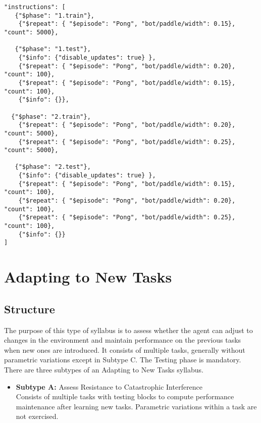 \begin{small}
\begin{verbatim}
"instructions": [    
   {"$phase": "1.train"}, 
    {"$repeat": { "$episode": "Pong", "bot/paddle/width": 0.15}, "count": 5000}, 

   {"$phase": "1.test"},   
    {"$info": {"disable_updates": true} },
    {"$repeat": { "$episode": "Pong", "bot/paddle/width": 0.20}, "count": 100},  
    {"$repeat": { "$episode": "Pong", "bot/paddle/width": 0.15}, "count": 100},  
    {"$info": {}},
   
  {"$phase": "2.train"},  
    {"$repeat": { "$episode": "Pong", "bot/paddle/width": 0.20}, "count": 5000},
    {"$repeat": { "$episode": "Pong", "bot/paddle/width": 0.25}, "count": 5000},

   {"$phase": "2.test"},   
    {"$info": {"disable_updates": true} },
    {"$repeat": { "$episode": "Pong", "bot/paddle/width": 0.15}, "count": 100},
    {"$repeat": { "$episode": "Pong", "bot/paddle/width": 0.20}, "count": 100},  
    {"$repeat": { "$episode": "Pong", "bot/paddle/width": 0.25}, "count": 100},  
    {"$info": {}}
]
\end{verbatim}
\end{small}

\section{Adapting to New Tasks}
\subsection*{Structure}

The purpose of this type of syllabus is to assess whether the agent can adjust to changes in the environment and maintain performance on the previous tasks when new ones are introduced. It consists of multiple tasks, generally without parametric variations except in Subtype C. The Testing phase is mandatory. There are three subtypes of an Adapting to New Tasks syllabus.

\begin{itemize}
    \item \textbf{Subtype A:} Assess Resistance to Catastrophic Interference\\
        Consists of multiple tasks with testing blocks to compute performance maintenance after learning new tasks. Parametric variations within a task are not exercised.\\
\end{itemize}

